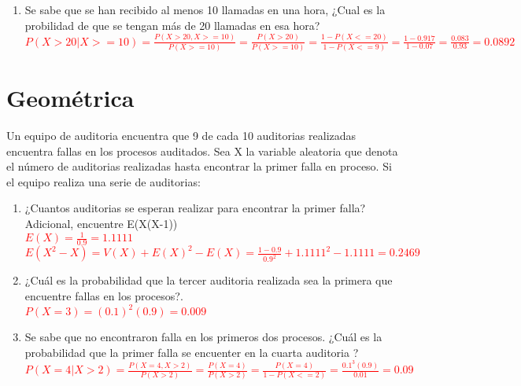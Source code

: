 \documentclass[addpoints]{exam}
\theoremstyle{mytheor}
\begin{document}
\begin{questions}
\begin{enumerate}
  \item Se sabe que se han recibido al menos 10 llamadas en una hora, ¿Cual es la probilidad de que se tengan más de 20 llamadas en esa hora? \\
  \textcolor{red}{$P(X>20|X>=10) = \frac{P(X>20, X>=10)}{P(X>=10)} = \frac{P(X>20)}{P(X>=10)} = \frac{1 - P(X<=20)}{1-P(X<=9)} = \frac{1-0.917}{1-0.07} = \frac{0.083}{0.93} = 0.0892$}

  \end{enumerate}
  
  \section*{Geométrica}
  
  \question Un equipo de auditoria encuentra que 9 de cada 10 auditorias realizadas encuentra fallas en los procesos auditados. Sea X la variable aleatoria que denota el número de auditorias realizadas hasta encontrar la primer falla en proceso. Si el equipo realiza una serie de auditorias:
   \begin{enumerate}
   \item ¿Cuantos auditorias se esperan realizar para encontrar la primer falla?
   Adicional, encuentre E(X(X-1)) \\
   \textcolor{red}{$E(X) = \frac{1}{0.9} = 1.1111$} \\
   \textcolor{red}{$E(X^2 -X) = V(X)+E(X)^2-E(X) = \frac{1-0.9}{0.9^2} + 1.1111^2 - 1.1111 = 0.2469$}
   
   \item ¿Cuál es la probabilidad que la tercer auditoria realizada sea la primera que encuentre fallas en los procesos?. \\
   \textcolor{red}{$P(X = 3) = (0.1)^2(0.9) = 0.009$}
   \item Se sabe que no encontraron falla en los primeros dos procesos. ¿Cuál es la probabilidad que la primer falla se encuenter en la cuarta auditoria ? \\
    \textcolor{red}{$P(X = 4 | X > 2) = \frac{P(X = 4, X > 2)}{P(X>2)} = \frac{P(X =4)}{P(X>2)} = \frac{P(X =4)}{1-P(X<=2)} = \frac{0.1^3 (0.9)}{0.01} = 0.09$}
   \end{enumerate}
  


\end{questions}
\end{document}
